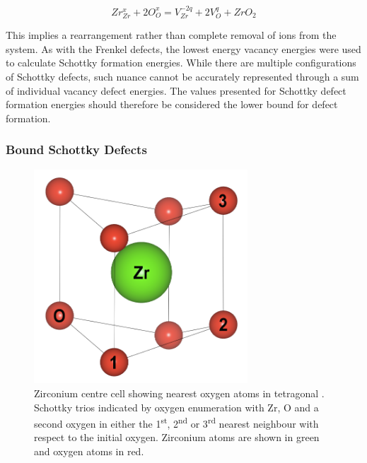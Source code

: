 \begin{equation}
\label{generic_schottky}
Zr^{x}_{Zr} + 2O^{x}_{O} = V^{-2q}_{Zr} + 2V^{q}_{O} + ZrO_{2}
\end{equation}

This implies a rearrangement rather than complete removal of ions from the system. As with the Frenkel defects, the lowest energy vacancy energies were used to calculate Schottky formation energies. While there are multiple configurations of Schottky defects, such nuance cannot be accurately represented through a sum of individual vacancy defect energies. The values presented for Schottky defect formation energies should therefore be considered the lower bound for defect formation. 


\subsubsection*{Bound Schottky Defects}


\begin{figure}[ht] %
\centering
\includegraphics[width=8cm]{images/zr_centre_tet.png}
\caption{Zirconium centre  cell showing nearest oxygen atoms in tetragonal \zirconia. Schottky trios indicated by oxygen enumeration with Zr, O and a second oxygen in either the 1\textsuperscript{st}, 2\textsuperscript{nd} or 3\textsuperscript{rd} nearest neighbour with respect to the initial oxygen. Zirconium atoms are shown in green and oxygen atoms in red.}
\label{figure:tetschottky}
\end{figure}

